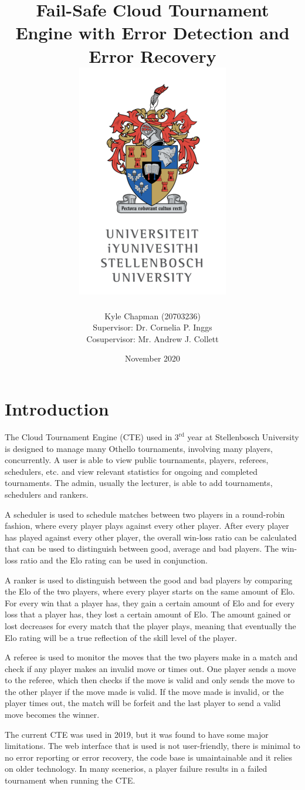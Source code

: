 \documentclass[a4paper, 12pt]{report}
\title{
	{Fail-Safe Cloud Tournament Engine with Error Detection and Error Recovery} \\
	{\includegraphics[scale=1.4]{logo.png}}
}
\author{
	{Kyle Chapman (20703236)} \\
	{Supervisor: Dr. Cornelia P. Inggs} \\
	{Cosupervisor: Mr. Andrew J. Collett}
}
\date{November 2020}
\begin{document}
\maketitle
\tableofcontents

\chapter{Introduction}

The Cloud Tournament Engine (CTE) used in $3^{\text{rd}}$ year at Stellenbosch
University is \mbox{designed} to manage many Othello \cite{othello} tournaments,
involving many players, concurrently. A user is able to view public tournaments,
players, referees, schedulers, etc. and view \mbox{relevant} statistics for
ongoing and completed tournaments. The admin, usually the \mbox{lecturer}, is
able to add tournaments, schedulers and rankers.

\vspace{0.8em}
A scheduler is used to schedule matches between two players in a round-robin
\mbox{fashion}, where every player plays against every other player. After every player
has played against every other player, the overall win-loss ratio can be calculated
that can be used to \mbox{distinguish} between good, average and bad players. The
win-loss ratio and the Elo rating \cite{elo} can be used in conjunction.

\vspace{0.8em}
A ranker is used to distinguish between the good and bad players by comparing
the Elo of the two players, where every player starts on the same amount of Elo.
For every win that a player has, they gain a certain amount of Elo and for every
loss that a player has, they lost a certain amount of Elo. The amount gained or
lost decreases for every match that the player plays, meaning that eventually
the Elo rating will be a true reflection of the skill level of the player.

\vspace{0.8em}
A referee is used to monitor the moves that the two players make in a match and
check if any player makes an invalid move or times out. One player sends a
move to the referee, which then checks if the move is valid and only sends
the move to the other player if the move made is valid. If the move made is
invalid, or the player times out, the match will be forfeit and the last player
to send a valid move becomes the winner.

\vspace{0.8em}
The current CTE was used in 2019, but it was found to have some major limitations.
The web interface that is used is not user-friendly, there is minimal to no
error reporting or error recovery, the code base is umaintainable and it
relies on older technology. In many scenerios, a player failure results in
a failed tournament when running the CTE.
\end{document}
